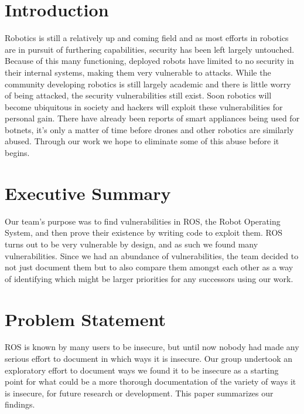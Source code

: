 \documentclass[IEEEtran,letterpaper,10pt,notitlepage,draftclsnofoot,onecolumn]{article}
\begin{document}
\newpage
{}
\tableofcontents
\clearpage

\section{Introduction}
Robotics is still a relatively up and coming field and as most efforts in robotics are in pursuit of furthering capabilities, security has been left largely untouched.
Because of this many functioning, deployed robots have limited to no security in their internal systems, making them very vulnerable to attacks.
While the community developing robotics is still largely academic and there is little worry of being attacked, the security vulnerabilities still exist.
Soon robotics will become ubiquitous in society and hackers will exploit these vulnerabilities for personal gain.
There have already been reports of smart appliances being used for botnets, it's only a matter of time before drones and other robotics are similarly abused. \cite{ddos}
Through our work we hope to eliminate some of this abuse before it begins.

\section{Executive Summary}
Our team’s purpose was to find vulnerabilities in ROS, the Robot Operating System, and then prove their existence by writing code to exploit them.
ROS turns out to be very vulnerable by design, and as such we found many vulnerabilities.
Since we had an abundance of vulnerabilities, the team decided to not just document them but to also compare them amongst each other as a way of identifying which might be larger priorities for any successors using our work.

\section{Problem Statement}
ROS is known by many users to be insecure, but until now nobody had made any serious effort to document in which ways it is insecure.
Our group undertook an exploratory effort to document ways we found it to be insecure as a starting point for what could be a more thorough documentation of the variety of ways it is insecure, for future research or development.
This paper summarizes our findings.
\end{document}
